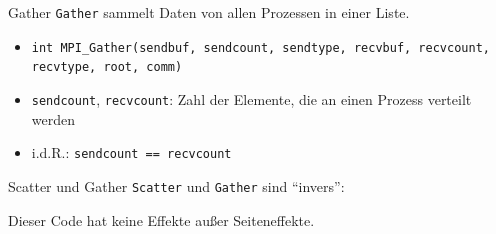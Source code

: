 \documentclass{beamer}
\newcommand{\code}[1]{
	\begin{mdframed}
		
	\end{mdframed}
}
\begin{document}
\begin{frame}{Gather}
	\texttt{Gather} sammelt Daten von allen Prozessen in einer Liste.

	\begin{figure}
	\end{figure}

	\begin{itemize}
		\item {\footnotesize \texttt{int MPI_Gather(sendbuf, sendcount, sendtype, recvbuf, recvcount, recvtype, root, comm)}}
		\item \texttt{sendcount}, \texttt{recvcount}: Zahl der Elemente, die an einen Prozess verteilt werden
		\item i.d.R.: \texttt{sendcount == recvcount}
	\end{itemize}
\end{frame}

\begin{frame}{Scatter und Gather}
	\texttt{Scatter} und \texttt{Gather} sind \enquote{invers}:

	\code{code/scatter.c}

	Dieser Code hat keine Effekte außer Seiteneffekte.
\end{frame}
\end{document}
